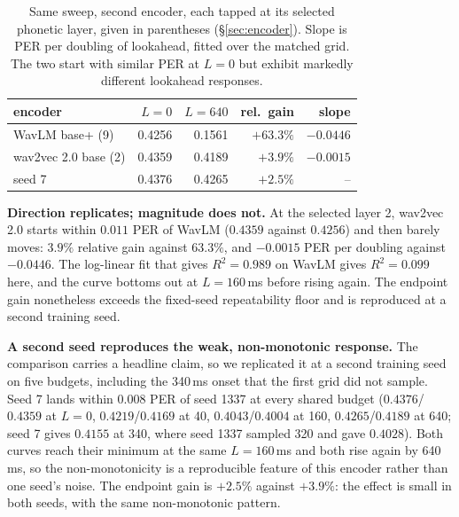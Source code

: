 \documentclass[journal]{IEEEtran}
\begin{document}
\begin{table}[t]
\centering\footnotesize
\setlength{\tabcolsep}{3.5pt}
\caption{Same sweep, second encoder, each tapped at its selected phonetic
layer, given in parentheses (\S\ref{sec:encoder}). Slope is PER per doubling
of lookahead, fitted over the matched grid. The two start with similar PER at
$L{=}0$ but exhibit markedly different lookahead responses.}
\label{tab:encoder}
\begin{tabular}{@{}lrrrr@{}}
\toprule
encoder & $L{=}0$ & $L{=}640$ & rel.\ gain & slope \\
\midrule
WavLM base+ (9)      & 0.4256 & 0.1561 & $+63.3\%$ & $-0.0446$ \\
wav2vec 2.0 base (2) & 0.4359 & 0.4189 & $+3.9\%$  & $-0.0015$ \\
\quad seed 7         & 0.4376 & 0.4265 & $+2.5\%$  & -- \\
\bottomrule
\end{tabular}
\end{table}

\textbf{Direction replicates; magnitude does not.} At the selected layer 2,
wav2vec 2.0 starts within $0.011$ PER of WavLM ($0.4359$ against $0.4256$) and
then barely moves: $3.9\%$ relative gain against $63.3\%$, and $-0.0015$ PER
per doubling against $-0.0446$. The log-linear fit that gives $R^2=0.989$ on
WavLM gives $R^2=0.099$ here, and the curve bottoms out at $L{=}160$\,ms
before rising again. The endpoint gain nonetheless exceeds the fixed-seed repeatability floor and
is reproduced at a second training seed.

\textbf{A second seed reproduces the weak, non-monotonic response.} The
comparison carries a headline claim, so we replicated it at a second training
seed on five budgets, including the 340\,ms onset that the first grid did not
sample. Seed 7 lands within $0.008$ PER of seed 1337 at every shared budget
($0.4376$/$0.4359$ at $L{=}0$, $0.4219$/$0.4169$ at 40, $0.4043$/$0.4004$ at
160, $0.4265$/$0.4189$ at 640; seed 7 gives $0.4155$ at 340, where seed 1337
sampled 320 and gave $0.4028$). Both curves reach their minimum at the same
$L{=}160$\,ms and both rise again by 640\,ms, so the non-monotonicity is a
reproducible feature of this encoder rather than one seed's noise. The endpoint
gain is $+2.5\%$ against $+3.9\%$: the effect is small in both seeds, with the
same non-monotonic pattern.
\end{document}
